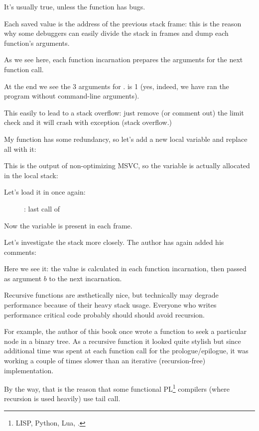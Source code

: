 It's usually true, unless the function has bugs.

Each saved \EBP value is the address of the previous \gls{stack frame}: 
this is the reason why some debuggers can easily divide the stack in frames and dump each 
function's arguments.

As we see here, each function incarnation prepares the arguments for the next function call.

At the end we see the 3 arguments for \main. 
 is 1 (yes, indeed, we have ran the program without command-line arguments).

This easily to lead to a stack overflow: just remove (or comment out) the limit check and it will crash with
exception  (stack overflow.)


My function has some redundancy, so let's add a new local variable  and replace all  with it:



This is the output of non-optimizing MSVC, so the  variable is actually allocated 
in the local stack:



\clearpage
Let's load it in \olly once again:

\begin{figure}[H]
\centering
{}
\caption{\olly: last call of \ttf{}}
\label{fig:fib_olly2}
\end{figure}

Now the  variable is present in each frame.

\clearpage

Let's investigate the stack more closely. The author has again added his comments:



Here we see it: the  value is calculated in each function incarnation, then passed as
argument $b$ to the next incarnation.


\label{Recursion_and_tail_call}
\myindex{\Recursion}
Recursive functions are \ae{}sthetically nice, but technically may degrade performance because
of their heavy stack usage.
Everyone who writes performance critical code probably should should avoid recursion.

For example, the author of this book once wrote a function to seek a particular node in a binary tree. 
As a recursive function it looked quite stylish but since additional time
was spent at each function call
for the prologue/epilogue, it was working a couple of times slower than an iterative (recursion-free)
implementation.

\newcommand{\FnFP}{\footnote{LISP, Python, Lua, \etc{}.}}

By the way, that is the reason that some functional \ac{PL}\FnFP{} compilers (where recursion is used heavily) use \gls{tail call}.
